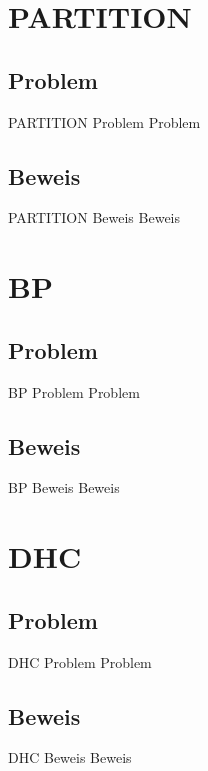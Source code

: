 \documentclass[12pt,donthandout,notes=dontshow,xcolor=table]{beamer}
\begin{document}
\section{PARTITION}
\subsection{Problem}
\begin{frame}{PARTITION Problem}
Problem
\end{frame}

\subsection{Beweis}
\begin{frame}{PARTITION Beweis}
Beweis
\end{frame}



\section{BP}
\subsection{Problem}
\begin{frame}{BP Problem}
Problem
\end{frame}

\subsection{Beweis}
\begin{frame}{BP Beweis}
Beweis
\end{frame}



\section{DHC}
\subsection{Problem}
\begin{frame}{DHC Problem}
Problem
\end{frame}

\subsection{Beweis}
\begin{frame}{DHC Beweis}
Beweis
\end{frame}
\end{document}
